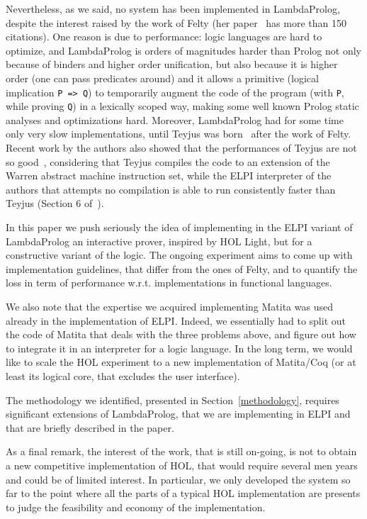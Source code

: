 \documentclass[preprint]{sigplanconf}
\begin{document}
Nevertheless, as we said, no system has been implemented in LambdaProlog, despite the interest raised by the work of Felty (her paper~\cite{amy4} has more than 150 citations). One reason is due to performance: logic languages are hard to optimize, and LambdaProlog is orders of magnitudes harder than Prolog not only because of binders and higher order unification, but also because it is higher order (one can pass predicates around) and it allows a primitive (logical implication \texttt{P => Q}) to temporarily augment the code of the program (with \texttt{P}, while proving \texttt{Q}) in a lexically scoped way, making some well known Prolog static analyses and optimizations hard. Moreover, LambdaProlog had for some time only very slow implementations, until Teyjus was born~\cite{teyjus1} after the work of Felty. Recent work by the authors also showed that the performances of Teyjus are not so good~\cite{elpi1}, considering that Teyjus compiles the code to an extension of the Warren abstract machine instruction set, while the ELPI interpreter of the authors that attempts no compilation is able to run consistently faster than Teyjus (Section 6 of~\cite{elpi1}).

In this paper we push seriously the idea of implementing in the ELPI variant of LambdaProlog an interactive prover, inspired by HOL Light, but for a constructive variant of the logic. The ongoing experiment aims to come up with implementation guidelines, that differ from the ones of Felty, and to quantify the loss in term of performance w.r.t. implementations in functional languages.

We also note that the expertise we acquired implementing Matita was used already in the implementation of ELPI. Indeed, we essentially had to split out the code of Matita that deals with the three problems above, and figure out how to integrate it in an interpreter for a logic language. In the long term, we would like to scale the HOL experiment to a new implementation of Matita/Coq (or at least its logical core, that excludes the user interface).

The methodology we identified, presented in Section~\ref{methodology}, requires significant extensions of LambdaProlog, that we are implementing in ELPI and that are briefly described in the paper. 

As a final remark, the interest of the work, that is still on-going, is not to obtain a new competitive implementation of HOL, that would require several men years and could be of limited interest. In particular, we only developed the system so far to the point where all the parts of a typical HOL implementation are presents to judge the feasibility and economy of the implementation.
\end{document}
